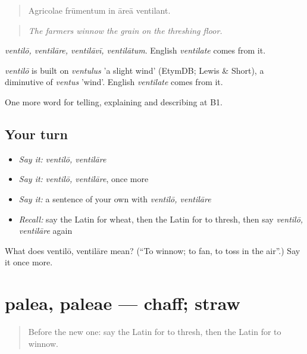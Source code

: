 \begin{quote}
Agricolae frūmentum in āreā ventilant.
\end{quote}

\begin{quote}
\emph{The farmers winnow the grain on the threshing floor.}
\end{quote}

\emph{ventilō, ventilāre, ventilāvī, ventilātum}. English \emph{ventilate} comes from it.

\begin{cousinweb}
\emph{ventilō} is built on \emph{ventulus} 'a slight wind' (EtymDB; Lewis \& Short), a diminutive of \emph{ventus} 'wind'. English \emph{ventilate} comes from it.
\end{cousinweb}

\begin{grammarlens}[title={What you've built}]
One more word for telling, explaining and describing at B1.
\end{grammarlens}

\subsection*{Your turn}
\begin{itemize}
\raggedright
  \item \emph{Say it:} \emph{ventilō, ventilāre}
  \item \emph{Say it:} \emph{ventilō, ventilāre}, once more
  \item \emph{Say it:} a sentence of your own with \emph{ventilō, ventilāre}
  \item \emph{Recall:} say the Latin for wheat, then the Latin for to thresh, then say \emph{ventilō, ventilāre} again
\end{itemize}

\begin{tcolorbox}[breakable,colback=teal!4,colframe=teal!35!black,title={Before you move on}]
What does ventilō, ventilāre mean? (\textquotedblleft{}To winnow; to fan, to toss in the air\textquotedblright{}.) Say it once more.
\end{tcolorbox}
\section[palea, paleae]{palea, paleae — chaff; straw}

\label{lesson:LA-C476-palea}



\begin{quote}
Before the new one: say the Latin for to thresh, then the Latin for to winnow.
\end{quote}

